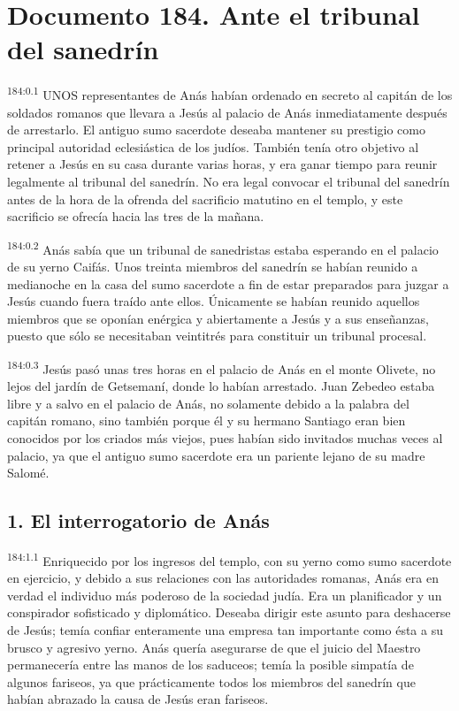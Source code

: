 \chapter{Documento 184. Ante el tribunal del sanedrín}
\par 
\textsuperscript{184:0.1} UNOS representantes de Anás habían ordenado en secreto al capitán de los soldados romanos que llevara a Jesús al palacio de Anás inmediatamente después de arrestarlo. El antiguo sumo sacerdote deseaba mantener su prestigio como principal autoridad eclesiástica de los judíos. También tenía otro objetivo al retener a Jesús en su casa durante varias horas, y era ganar tiempo para reunir legalmente al tribunal del sanedrín. No era legal convocar el tribunal del sanedrín antes de la hora de la ofrenda del sacrificio matutino en el templo, y este sacrificio se ofrecía hacia las tres de la mañana.

\par 
\textsuperscript{184:0.2} Anás sabía que un tribunal de sanedristas estaba esperando en el palacio de su yerno Caifás. Unos treinta miembros del sanedrín se habían reunido a medianoche en la casa del sumo sacerdote a fin de estar preparados para juzgar a Jesús cuando fuera traído ante ellos. Únicamente se habían reunido aquellos miembros que se oponían enérgica y abiertamente a Jesús y a sus enseñanzas, puesto que sólo se necesitaban veintitrés para constituir un tribunal procesal.

\par 
\textsuperscript{184:0.3} Jesús pasó unas tres horas en el palacio de Anás en el monte Olivete, no lejos del jardín de Getsemaní, donde lo habían arrestado. Juan Zebedeo estaba libre y a salvo en el palacio de Anás, no solamente debido a la palabra del capitán romano, sino también porque él y su hermano Santiago eran bien conocidos por los criados más viejos, pues habían sido invitados muchas veces al palacio, ya que el antiguo sumo sacerdote era un pariente lejano de su madre Salomé.

\section*{1. El interrogatorio de Anás}
\par 
\textsuperscript{184:1.1} Enriquecido por los ingresos del templo, con su yerno como sumo sacerdote en ejercicio, y debido a sus relaciones con las autoridades romanas, Anás era en verdad el individuo más poderoso de la sociedad judía. Era un planificador y un conspirador sofisticado y diplomático. Deseaba dirigir este asunto para deshacerse de Jesús; temía confiar enteramente una empresa tan importante como ésta a su brusco y agresivo yerno. Anás quería asegurarse de que el juicio del Maestro permanecería entre las manos de los saduceos; temía la posible simpatía de algunos fariseos, ya que prácticamente todos los miembros del sanedrín que habían abrazado la causa de Jesús eran fariseos.

